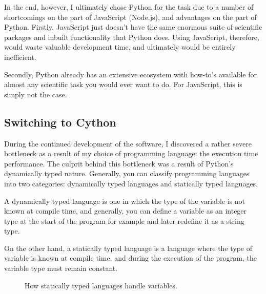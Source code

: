 In the end, however, I ultimately chose Python for the task due to a number of shortcomings on the part of JavaScript (Node.js), and advantages on the part of Python. Firstly, JavaScript just doesn’t have the same enormous suite of scientific packages and inbuilt functionality that Python does. Using JavaScript, therefore, would waste valuable development time, and ultimately would be entirely inefficient.

Secondly, Python already has an extensive ecosystem with how-to’s available for almost any scientific task you would ever want to do. For JavaScript, this is simply not the case.\cite{javascript_vs_python}

\subsection{Switching to Cython}
During the continued development of the software, I discovered a rather severe bottleneck as a result of my choice of programming language: the execution time performance. The culprit behind this bottleneck was a result of Python's dynamically typed nature. Generally, you can classify programming languages into two categories: dynamically typed languages and statically typed languages. 

\begin{definition}
A dynamically typed language is one in which the type of the variable is not known at compile time, and generally, you can define a variable as an integer type at the start of the program for example and later redefine it as a string type. 
\end{definition}

On the other hand, a statically typed language is a language where the type of variable is known at compile time, and during the execution of the program, the variable type must remain constant. 

\hfill

\begin{figure}[H]
    \centering
    \caption{How statically typed languages handle variables.}
\end{figure}

